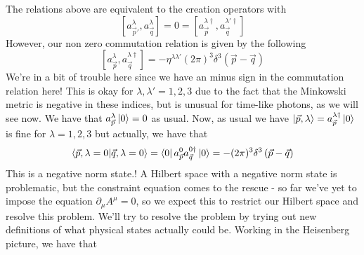 The relations above are equivalent to 
the creation operators with 
\[
 \left[  a _{ \vec{p}' } ^ \lambda , a _{ \vec{q} } ^ \lambda  \right]   =0 =
 \left[  a _{ \vec{p} } ^{ \lambda \dagger } , a _{ \vec{q} } ^{ \lambda ' \dagger }   \right]  
\] However, our non zero commutation relation is given by the following 
\[
 \left[  a_{\vec{p} } ^\lambda , a _{ \vec{q} } ^{ \lambda \dagger }  \right]   = 
 - \eta ^{ \lambda \lambda ' } \left( 2 \pi  \right) ^ 3 \delta ^ 3 ( \vec{p} - \vec{q} ) 
\] We're in a bit of trouble here since we have 
an minus sign in the commutation relation here! This is
okay for $ \lambda, \lambda '  = 1, 2, 3 $ due to 
the fact that the Minkowski metric is negative 
in these indices, 
but is unusual for time-like photons, as we will see now.  
We have that $ a _{\vec{p} } ^{ \lambda } \ket{ 0 }  =0  $ as usual. 
Now, as usual we have $ \ket{ \vec{p}, \lambda }  = a_{\vec{p} }^{ \lambda \dagger } \ket{ 0 } $
is fine for $\lambda = 1, 2, 3 $ but actually, we have that 
\[
	\bra{ \vec{p}, \lambda = 0 }\ket{ \vec{q}, \lambda = 0 }  = 
	\bra{ 0 } a_{\vec{p} } ^ 0 a _{\vec{q} } ^{ 0 \dagger } \ket{ 0 }  = - ( 2 \pi )^{ 3 } 
	\delta ^ 3 \left( \vec{p} -  \vec{q} \right) 
\] This is a negative norm state.!
A Hilbert space with a negative norm state is problematic, but the 
constraint equation comes to the rescue - so far we've yet 
to impose the equation $ \partial  _ \mu A ^ \mu  = 0$, 
so we expect this to restrict our Hilbert space and resolve this problem. 
We'll try to 
resolve the problem by trying out new definitions of what 
physical states actually could be. Working in 
the Heisenberg picture, we have that 
